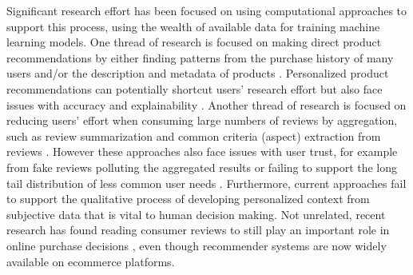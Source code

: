 Significant research effort has been focused on using computational approaches to support this process, using the wealth of available data for training machine learning models. One thread of research is focused on making direct product recommendations by either finding patterns from the purchase history of many users \cite{bobadilla2013recommender} and/or the description and metadata of products \cite{Lops2011ContentbasedRS}. Personalized product recommendations can potentially shortcut users' research effort but also face issues with accuracy and explainability \cite{bilgic2005explaining}. Another thread of research is focused on reducing users' effort when consuming large numbers of reviews by aggregation, such as review summarization and common criteria (aspect) extraction from reviews \cite{Howmerch65:online}. However these approaches also face issues with user trust, for example from fake reviews polluting the aggregated results or failing to support the long tail distribution of less common user needs \cite{bernstein2012direct}. Furthermore, current approaches fail to support the qualitative process of developing personalized context from subjective data that is vital to human decision making. Not unrelated, recent research has found reading consumer reviews to still play an important role in online purchase decisions \cite{gan2012helpfulness,mudambi2010research}, even though recommender systems are now widely available on ecommerce platforms. 

